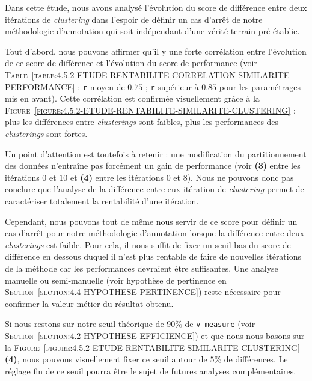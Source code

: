 			Dans cette étude, nous avons analysé l'évolution du score de différence entre deux itérations de \textit{clustering} dans l'espoir de définir un cas d'arrêt de notre méthodologie d'annotation qui soit indépendant d'une vérité terrain pré-établie.
			
			Tout d'abord, nous pouvons affirmer qu'il y une forte corrélation entre l'évolution de ce score de différence et l'évolution du score de performance (voir \textsc{Table~\ref{table:4.5.2-ETUDE-RENTABILITE-CORRELATION-SIMILARITE-PERFORMANCE}} : \texttt{r} moyen de $0.75$ ; \texttt{r} supérieur à $0.85$ pour les paramétrages mis en avant).
			Cette corrélation est confirmée visuellement grâce à la \textsc{Figure~\ref{figure:4.5.2-ETUDE-RENTABILITE-SIMILARITE-CLUSTERING}} : plus les différences entre \textit{clusterings} sont faibles, plus les performances des \textit{clusterings} sont fortes.
			
			Un point d'attention est toutefois à retenir : une modification du partitionnement des données n'entraîne pas forcément un gain de performance (voir \textbf{(3)} entre les itérations $0$ et $10$ et \textbf{(4)} entre les itérations $0$ et $8$).
			Nous ne pouvons donc pas conclure que l'analyse de la différence entre eux itération de \textit{clustering} permet de caractériser totalement la rentabilité d'une itération.
			
			Cependant, nous pouvons tout de même nous servir de ce score pour définir un cas d'arrêt pour notre méthodologie d'annotation lorsque la différence entre deux \textit{clusterings} est faible.
			Pour cela, il nous suffit de fixer un seuil bas du score de différence en dessous duquel il n'est plus rentable de faire de nouvelles itérations de la méthode car les performances devraient être suffisantes.
			Une analyse manuelle ou semi-manuelle (voir hypothèse de pertinence en \textsc{Section~\ref{section:4.4-HYPOTHESE-PERTINENCE}}) reste nécessaire pour confirmer la valeur métier du résultat obtenu.
			
			\begin{leftBarIdea}
				Si nous restons sur notre seuil théorique de $90$\% de \texttt{v-measure} (voir \textsc{Section~\ref{section:4.2-HYPOTHESE-EFFICIENCE}}) et que nous nous basons sur la \textsc{Figure~\ref{figure:4.5.2-ETUDE-RENTABILITE-SIMILARITE-CLUSTERING}} \textbf{(4)}, nous pouvons visuellement fixer ce seuil autour de $5$\% de différences.
				Le réglage fin de ce seuil pourra être le sujet de futures analyses complémentaires.
			\end{leftBarIdea}
			
